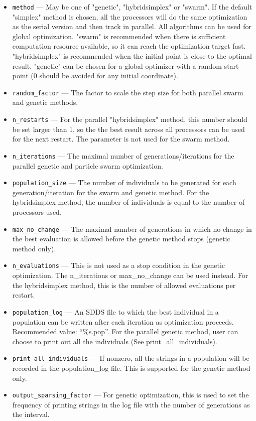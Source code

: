 \documentclass[11pt]{article}
\begin{document}
\begin{itemize}
\item \verb|method| --- May be one of "genetic", "hybridsimplex" or "swarm". If the default "simplex" method is chosen, all the processors will do the same optimization as the serial version and then track in parallel. All algorithms can be used for global optimization. "swarm" is recommended when there is sufficient computation resource available, so it can reach the optimization target fast. "hybridsimplex" is recommended when the initial point is close to the optimal result. "genetic" can be chosen for a global optimizer with a random start point (0 should be avoided for any initial coordinate). 

\item \verb|random_factor| --- The factor to scale the step size for both parallel swarm and genetic methods.

\item \verb|n_restarts| --- For the parallel "hybridsimplex" method, this number should be set larger than 1, so the the best result across all processors can be used for the next restart. The parameter is not used for the swarm method.

\item \verb|n_iterations| --- The maximal number of generations/iterations for the parallel genetic and particle swarm optimization. 

\item \verb|population_size| --- The number of individuals to be generated for each generation/iteration for the swarm and genetic method. For the hybridsimplex method, the number of individuals is equal to the number of processors used.

\item \verb|max_no_change| --- The maximal number of generations in which no change in the best evaluation is allowed before the genetic method stops (genetic method only).

\item \verb|n_evaluations| --- This is not used as a stop condition in the genetic optimization. The n\_iterations or max\_no\_change can be used instead. For the hybridsimplex method, this is the number of allowed evaluations per restart. 

\item \verb|population_log| --- An SDDS file to which the best individual in a population can be written after each iteration as optimization proceeds. Recommended value: ``\%s.pop''. For the parallel genetic method, user can choose to print out all the individuals (See print\_all\_individuals).

\item \verb|print_all_individuals| --- If nonzero, all the strings in a population will be recorded in the population\_log file. This is supported for the genetic method only.

\item \verb|output_sparsing_factor| --- For genetic optimization, this is used to set the frequency of printing strings in the log file with the number of generations as the interval.

\end{itemize}
\end{document}
